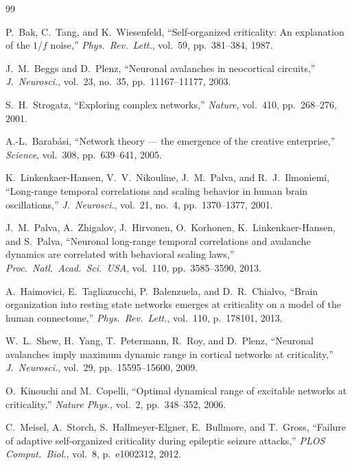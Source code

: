 \documentclass[12pt,a4paper]{article}
\begin{document}
\begin{thebibliography}{99}

  P.~Bak, C.~Tang, and K.~Wiesenfeld,
  ``Self-organized criticality: An explanation of the $1/f$ noise,''
  \textit{Phys.\ Rev.\ Lett.}, vol.~59, pp.~381--384, 1987.

  J.~M.~Beggs and D.~Plenz,
  ``Neuronal avalanches in neocortical circuits,''
  \textit{J.\ Neurosci.}, vol.~23, no.~35, pp.~11167--11177, 2003.

  S.~H.~Strogatz,
  ``Exploring complex networks,''
  \textit{Nature}, vol.~410, pp.~268--276, 2001.

  A.-L.~Barabási,
  ``Network theory — the emergence of the creative enterprise,''
  \textit{Science}, vol.~308, pp.~639--641, 2005.

  K.~Linkenkaer-Hansen, V.~V.~Nikouline, J.~M.~Palva, and
  R.~J.~Ilmoniemi,
  ``Long-range temporal correlations and scaling behavior in human brain
    oscillations,''
  \textit{J.\ Neurosci.}, vol.~21, no.~4, pp.~1370--1377, 2001.

  J.~M.~Palva, A.~Zhigalov, J.~Hirvonen, O.~Korhonen, K.~Linkenkaer-Hansen,
  and S.~Palva,
  ``Neuronal long-range temporal correlations and avalanche dynamics are
    correlated with behavioral scaling laws,''
  \textit{Proc.\ Natl.\ Acad.\ Sci.\ USA}, vol.~110, pp.~3585--3590, 2013.

  A.~Haimovici, E.~Tagliazucchi, P.~Balenzuela, and D.~R.~Chialvo,
  ``Brain organization into resting state networks emerges at criticality
    on a model of the human connectome,''
  \textit{Phys.\ Rev.\ Lett.}, vol.~110, p.~178101, 2013.

  W.~L.~Shew, H.~Yang, T.~Petermann, R.~Roy, and D.~Plenz,
  ``Neuronal avalanches imply maximum dynamic range in cortical networks
    at criticality,''
  \textit{J.\ Neurosci.}, vol.~29, pp.~15595--15600, 2009.

  O.~Kinouchi and M.~Copelli,
  ``Optimal dynamical range of excitable networks at criticality,''
  \textit{Nature Phys.}, vol.~2, pp.~348--352, 2006.

  C.~Meisel, A.~Storch, S.~Hallmeyer-Elgner, E.~Bullmore, and T.~Gross,
  ``Failure of adaptive self-organized criticality during epileptic
    seizure attacks,''
  \textit{PLOS Comput.\ Biol.}, vol.~8, p.~e1002312, 2012.


\end{thebibliography}
\end{document}
